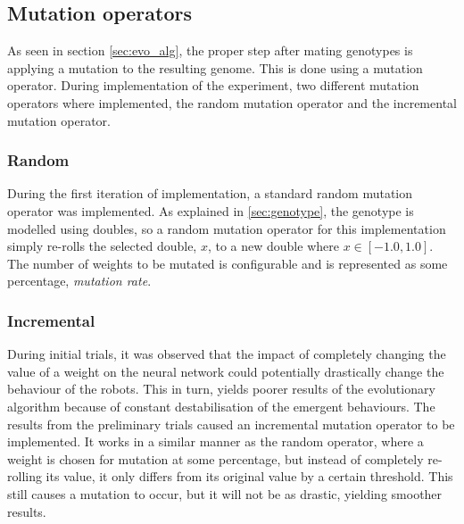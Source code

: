 \subsection{Mutation operators}
As seen in section \ref{sec:evo_alg}, the proper step after mating genotypes is applying a mutation to the resulting genome.
This is done using a mutation operator.
During implementation of the experiment, two different mutation operators where implemented, the random mutation operator and the incremental mutation operator.

\subsubsection{Random}
During the first iteration of implementation, a standard random mutation operator was implemented.
As explained in \ref{sec:genotype}, the genotype is modelled using doubles, so a random mutation operator for this implementation simply re-rolls the selected double, $x$, to a new double where $x \in [-1.0, 1.0]$. 
The number of weights to be mutated is configurable and is represented as some percentage, \emph{mutation rate}.

\subsubsection{Incremental}
During initial trials, it was observed that the impact of completely changing the value of a weight on the neural network could potentially drastically change the behaviour of the robots.
This in turn, yields poorer results of the evolutionary algorithm because of constant destabilisation of the emergent behaviours.
The results from the preliminary trials caused an incremental mutation operator to be implemented.
It works in a similar manner as the random operator, where a weight is chosen for mutation at some percentage, but instead of completely re-rolling its value, it only differs from its original value by a certain threshold.
This still causes a mutation to occur, but it will not be as drastic, yielding smoother results. 

